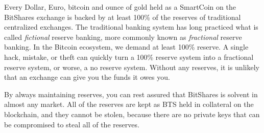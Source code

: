 Every Dollar, Euro, bitcoin and ounce of gold held as a SmartCoin on the
BitShares exchange is backed by at least 100\% of the reserves of traditional
centralized exchanges. The traditional banking system has long practiced what
is called \emph{fictional} reserve banking, more commonly known as
\emph{fractional} reserve banking. In the Bitcoin ecosystem, we demand at least
100\% reserve. A single hack, mistake, or theft can quickly turn a 100\%
reserve system into a fractional reserve system, or worse, a no reserve system.
Without any reserves, it is unlikely that an exchange can give you the funds it
owes you.

By always maintaining reserves, you can rest assured that BitShares is solvent
in almost any market. All of the reserves are kept as BTS held in collateral on
the blockchain, and they cannot be stolen, because there are no private keys
that can be compromised to steal all of the reserves.
